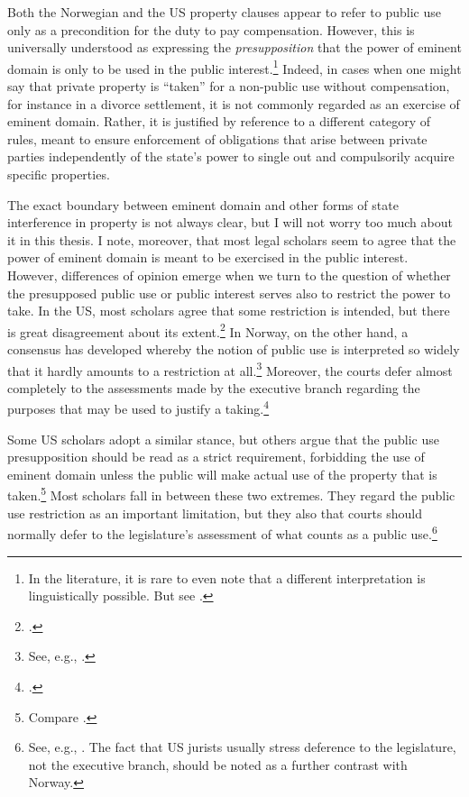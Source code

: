 Both the Norwegian and the US property clauses appear to refer to public use only as a precondition for the duty to pay compensation. However, this is universally understood as expressing the {\it presupposition} that the power of eminent domain is only to be used in the public interest.\footnote{In the literature, it is rare to even note that a different interpretation is linguistically possible. But see \cite[205]{berger78}.} Indeed, in cases when one might say that private property is ``taken'' for a non-public use without compensation, for instance in a divorce settlement, it is not commonly regarded as an exercise of eminent domain. Rather, it is justified by reference to a different category of rules, meant to ensure enforcement of obligations that arise between private parties independently of the state's power to single out and compulsorily acquire specific properties.

The exact boundary between eminent domain and other forms of state interference in property is not always clear, but I will not worry too much about it in this thesis. I note, moreover, that most legal scholars seem to agree that the power of eminent domain is meant to be exercised in the public interest. However, differences of opinion emerge when we turn to the question of whether the presupposed public use or public interest serves also to restrict the power to take. In the US, most scholars agree that some restriction is intended, but there is great disagreement about its extent.\footcite[205]{berger78} In Norway, on the other hand, a consensus has developed whereby the notion of public use is interpreted so widely that it hardly amounts to a restriction at all.\footnote{See, e.g., \cite[368]{aall10}.} Moreover, the courts defer almost completely to the assessments made by the executive branch regarding the purposes that may be used to justify a taking.\footcite[368]{aall10}

Some US scholars adopt a similar stance, but others argue that the public use presupposition should be read as a strict requirement, forbidding the use of eminent domain unless the public will make actual use of the property that is taken.\footnote{Compare \cite{bell06,bell09,claeys04,sandefur06}.} Most scholars fall in between these two extremes. They regard the public use restriction as an important limitation, but they also  that courts should normally defer to the legislature's assessment of what counts as a public use.\footnote{See, e.g., \cite{merrill86,alexander05}. The fact that US jurists usually stress deference to the legislature, not the executive branch, should be noted as a further contrast with Norway.}


